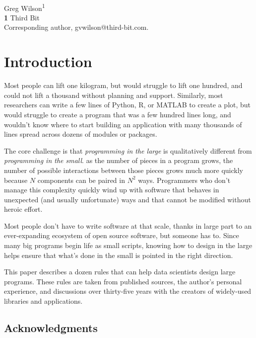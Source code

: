 \documentclass[10pt,letterpaper]{article}
\begin{document}
\vspace*{0.2in}

\begin{flushleft}
{\Large
\textbf{}
}
\newline
\\
{Greg Wilson}\textsuperscript{1{\ddag}}
\\
\bigskip
\textbf{1} Third Bit\\
{\ddag} Corresponding author, gvwilson@third-bit.com.
\end{flushleft}

\section*{Introduction}

Most people can lift one kilogram,
but would struggle to lift one hundred,
and could not lift a thousand without planning and support.
Similarly,
most researchers can write a few lines of Python, R, or MATLAB to create a plot,
but would struggle to create a program that was a few hundred lines long,
and wouldn't know where to start building an application with many thousands of lines
spread across dozens of modules or packages.

The core challenge is that
\emph{programming in the large} is qualitatively different from \emph{programming in the small}.
as the number of pieces in a program grows,
the number of possible interactions between those pieces grows much more quickly
because $N$ components can be paired in $N^2$ ways.
Programmers who don't manage this complexity
quickly wind up with software that behaves in unexpected (and usually unfortunate) ways
and that cannot be modified without heroic effort.

Most people don't have to write software at that scale,
thanks in large part to an ever-expanding ecosystem of open source software,
but someone has to.
Since many big programs begin life as small scripts,
knowing how to design in the large helps ensure that what's done in the small
is pointed in the right direction.

This paper describes a dozen rules that can help data scientists design large programs.
These rules are taken from published sources,
the author's personal experience,
and discussions over thirty-five years with the creators of widely-used libraries and applications.

\subsection*{Acknowledgments}
\end{document}
